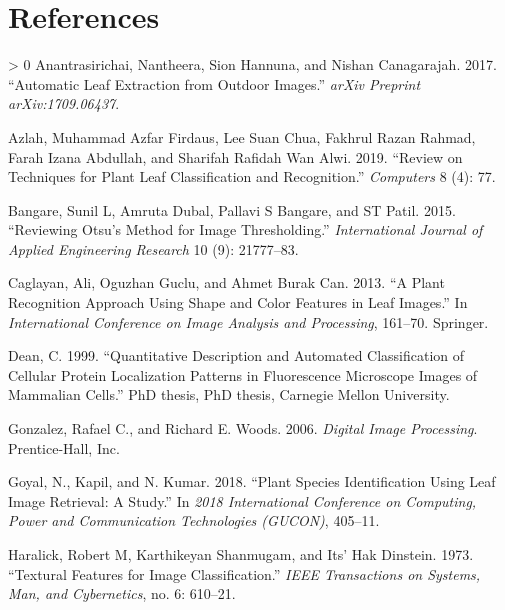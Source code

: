 \documentclass{article}
\newlength{\cslhangindent}
\newenvironment{CSLReferences}[3] %
 {%
  \setlength{\parindent}{0pt}
  \ifodd #1 \everypar{\setlength{\hangindent}{\cslhangindent}}\ignorespaces\fi
  \ifnum #2 > 0
  \setlength{\parskip}{#2\baselineskip}
  \fi
 }%
 {}
\begin{document}
\hypertarget{references}{%
\section*{References}\label{references}}

\hypertarget{refs}{}
\begin{CSLReferences}{1}{0}
\leavevmode\hypertarget{ref-DBLP}{}%
Anantrasirichai, Nantheera, Sion Hannuna, and Nishan Canagarajah. 2017.
{``Automatic Leaf Extraction from Outdoor Images.''} \emph{arXiv
Preprint arXiv:1709.06437}.

\leavevmode\hypertarget{ref-articlepl}{}%
Azlah, Muhammad Azfar Firdaus, Lee Suan Chua, Fakhrul Razan Rahmad,
Farah Izana Abdullah, and Sharifah Rafidah Wan Alwi. 2019. {``Review on
Techniques for Plant Leaf Classification and Recognition.''}
\emph{Computers} 8 (4): 77.

\leavevmode\hypertarget{ref-bangare2015reviewing}{}%
Bangare, Sunil L, Amruta Dubal, Pallavi S Bangare, and ST Patil. 2015.
{``Reviewing Otsu's Method for Image Thresholding.''}
\emph{International Journal of Applied Engineering Research} 10 (9):
21777--83.

\leavevmode\hypertarget{ref-inproceedings1}{}%
Caglayan, Ali, Oguzhan Guclu, and Ahmet Burak Can. 2013. {``A Plant
Recognition Approach Using Shape and Color Features in Leaf Images.''}
In \emph{International Conference on Image Analysis and Processing},
161--70. Springer.

\leavevmode\hypertarget{ref-article31}{}%
Dean, C. 1999. {``Quantitative Description and Automated Classification
of Cellular Protein Localization Patterns in Fluorescence Microscope
Images of Mammalian Cells.''} PhD thesis, PhD thesis, Carnegie Mellon
University.

\leavevmode\hypertarget{ref-book1}{}%
Gonzalez, Rafael C., and Richard E. Woods. 2006. \emph{Digital Image
Processing}. Prentice-Hall, Inc.

\leavevmode\hypertarget{ref-8675114}{}%
Goyal, N., Kapil, and N. Kumar. 2018. {``Plant Species Identification
Using Leaf Image Retrieval: A Study.''} In \emph{2018 International
Conference on Computing, Power and Communication Technologies (GUCON)},
405--11.

\leavevmode\hypertarget{ref-articletx}{}%
Haralick, Robert M, Karthikeyan Shanmugam, and Its' Hak Dinstein. 1973.
{``Textural Features for Image Classification.''} \emph{IEEE
Transactions on Systems, Man, and Cybernetics}, no. 6: 610--21.


\end{CSLReferences}
\end{document}

